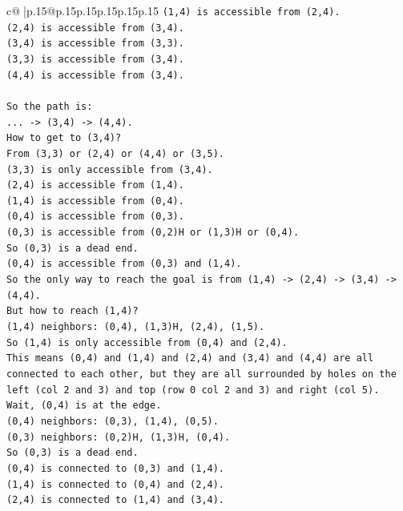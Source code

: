 \documentclass{article}
\begin{document}
{\begin{supertabular}{c@{$\;$}|p{.15\linewidth}@{}p{.15\linewidth}p{.15\linewidth}p{.15\linewidth}p{.15\linewidth}p{.15\linewidth}}
{{{\texttt{(1,4) is accessible from (2,4).} \\
\texttt{(2,4) is accessible from (3,4).} \\
\texttt{(3,4) is accessible from (3,3).} \\
\texttt{(3,3) is accessible from (3,4).} \\
\texttt{(4,4) is accessible from (3,4).} \\
\\ 
\texttt{So the path is:} \\
\texttt{... {-}> (3,4) {-}> (4,4).} \\
\texttt{How to get to (3,4)?} \\
\texttt{From (3,3) or (2,4) or (4,4) or (3,5).} \\
\texttt{(3,3) is only accessible from (3,4).} \\
\texttt{(2,4) is accessible from (1,4).} \\
\texttt{(1,4) is accessible from (0,4).} \\
\texttt{(0,4) is accessible from (0,3).} \\
\texttt{(0,3) is accessible from (0,2)H or (1,3)H or (0,4).} \\
\texttt{So (0,3) is a dead end.} \\
\texttt{(0,4) is accessible from (0,3) and (1,4).} \\
\texttt{So the only way to reach the goal is from (1,4) {-}> (2,4) {-}> (3,4) {-}> (4,4).} \\
\texttt{But how to reach (1,4)?} \\
\texttt{(1,4) neighbors: (0,4), (1,3)H, (2,4), (1,5).} \\
\texttt{So (1,4) is only accessible from (0,4) and (2,4).} \\
\texttt{This means (0,4) and (1,4) and (2,4) and (3,4) and (4,4) are all connected to each other, but they are all surrounded by holes on the left (col 2 and 3) and top (row 0 col 2 and 3) and right (col 5).} \\
\texttt{Wait, (0,4) is at the edge.} \\
\texttt{(0,4) neighbors: (0,3), (1,4), (0,5).} \\
\texttt{(0,3) neighbors: (0,2)H, (1,3)H, (0,4).} \\
\texttt{So (0,3) is a dead end.} \\
\texttt{(0,4) is connected to (0,3) and (1,4).} \\
\texttt{(1,4) is connected to (0,4) and (2,4).} \\
\texttt{(2,4) is connected to (1,4) and (3,4).} \\
}}}
\end{supertabular}}
\end{document}
